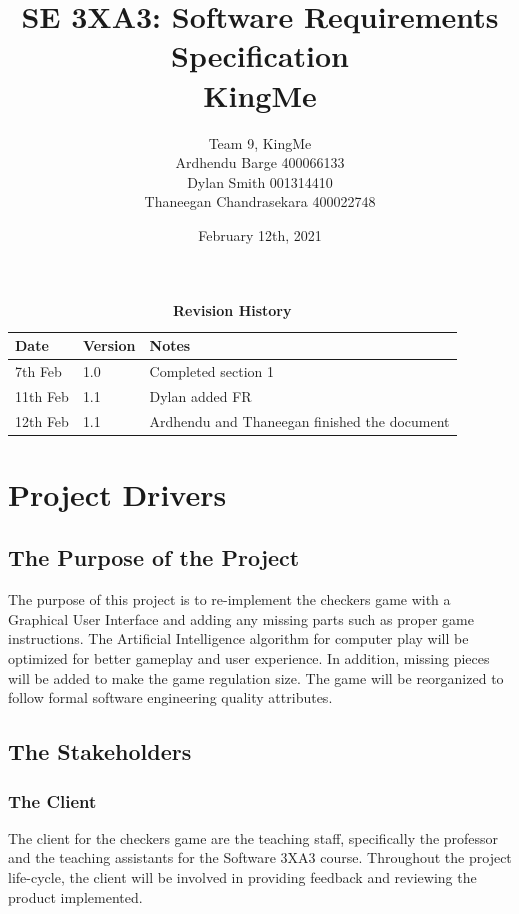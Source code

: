 \documentclass[12pt, titlepage]{article}
\title{SE 3XA3: Software Requirements Specification\\KingMe}
\author{Team 9, KingMe
		\\ Ardhendu Barge 400066133
		\\ Dylan Smith 001314410
		\\ Thaneegan Chandrasekara 400022748
}
\date{February 12th, 2021}
\begin{document}
\maketitle

\tableofcontents
\listoftables
\listoffigures

\begin{table}[bp]
\caption{\bf Revision History}
\begin{tabularx}{\textwidth}{p{3cm}p{2cm}X}
\toprule {\bf Date} & {\bf Version} & {\bf Notes}\\
\midrule
7th Feb & 1.0 & Completed section 1\\
11th Feb & 1.1 & Dylan added FR\\
12th Feb & 1.1 & Ardhendu and Thaneegan finished the document\\
\bottomrule
\end{tabularx}
\end{table}

\newpage



\section{Project Drivers}

\subsection{The Purpose of the Project}
The purpose of this project is to re-implement the checkers game with a Graphical User Interface and adding any missing parts such as proper game instructions. The Artificial Intelligence algorithm for computer play will be optimized for better gameplay and user experience. In addition, missing pieces will be added to make the game regulation size. The game will be reorganized to follow formal software engineering quality attributes.  

\subsection{The Stakeholders}

\subsubsection{The Client}
The client for the checkers game are the teaching staff, specifically the professor and the teaching assistants for the Software 3XA3 course. Throughout the project life-cycle, the client will be involved in providing feedback and reviewing the product implemented. 
\end{document}
